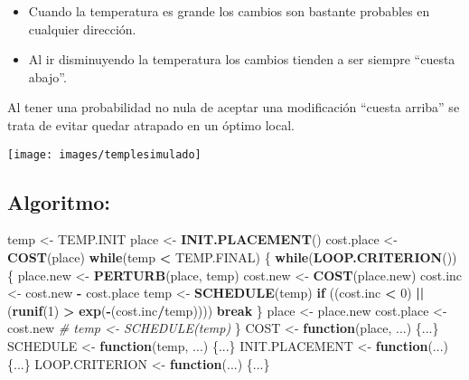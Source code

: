 \documentclass[
]{book}
\newenvironment{Shaded}{\begin{snugshade}}{\end{snugshade}}
\newcommand{\CommentTok}[1]{\textcolor[rgb]{0.56,0.35,0.01}{\textit{#1}}}
\newcommand{\ControlFlowTok}[1]{\textcolor[rgb]{0.13,0.29,0.53}{\textbf{#1}}}
\newcommand{\DecValTok}[1]{\textcolor[rgb]{0.00,0.00,0.81}{#1}}
\newcommand{\KeywordTok}[1]{\textcolor[rgb]{0.13,0.29,0.53}{\textbf{#1}}}
\newcommand{\NormalTok}[1]{#1}
\newcommand{\OperatorTok}[1]{\textcolor[rgb]{0.81,0.36,0.00}{\textbf{#1}}}
\newcommand{\StringTok}[1]{\textcolor[rgb]{0.31,0.60,0.02}{#1}}
\theoremstyle{break}
\theoremstyle{definition}
\theoremstyle{definition}
\theoremstyle{definition}
\theoremstyle{remark}
\begin{document}
\begin{itemize}
\item
  Cuando la temperatura es grande los cambios son bastante
  probables en cualquier dirección.
\item
  Al ir disminuyendo la temperatura los cambios tienden a ser
  siempre ``cuesta abajo''.
\end{itemize}

Al tener una probabilidad no nula de aceptar una modificación
``cuesta arriba'' se trata de evitar quedar atrapado en un
óptimo local.

\begin{center}\texttt{[image: images/templesimulado]} \end{center}

\hypertarget{algoritmo-1}{%
\subsection{Algoritmo:}\label{algoritmo-1}}

\begin{Shaded}
\begin{Highlighting}[]
\NormalTok{temp <-}\StringTok{ }\NormalTok{TEMP.INIT}
\NormalTok{place <-}\StringTok{ }\KeywordTok{INIT.PLACEMENT}\NormalTok{()}
\NormalTok{cost.place <-}\StringTok{ }\KeywordTok{COST}\NormalTok{(place)}
\ControlFlowTok{while}\NormalTok{(temp }\OperatorTok{<}\StringTok{ }\NormalTok{TEMP.FINAL) \{}
  \ControlFlowTok{while}\NormalTok{(}\KeywordTok{LOOP.CRITERION}\NormalTok{()) \{}
\NormalTok{    place.new <-}\StringTok{ }\KeywordTok{PERTURB}\NormalTok{(place, temp)}
\NormalTok{    cost.new <-}\StringTok{ }\KeywordTok{COST}\NormalTok{(place.new)}
\NormalTok{    cost.inc <-}\StringTok{ }\NormalTok{cost.new }\OperatorTok{-}\StringTok{ }\NormalTok{cost.place}
\NormalTok{    temp <-}\StringTok{ }\KeywordTok{SCHEDULE}\NormalTok{(temp)}
    \ControlFlowTok{if}\NormalTok{ ((cost.inc }\OperatorTok{<}\StringTok{ }\DecValTok{0}\NormalTok{) }\OperatorTok{||}\StringTok{ }\NormalTok{(}\KeywordTok{runif}\NormalTok{(}\DecValTok{1}\NormalTok{) }\OperatorTok{>}\StringTok{ }\KeywordTok{exp}\NormalTok{(}\OperatorTok{-}\NormalTok{(cost.inc}\OperatorTok{/}\NormalTok{temp)))) }\ControlFlowTok{break}
\NormalTok{  \}}
\NormalTok{  place <-}\StringTok{ }\NormalTok{place.new}
\NormalTok{  cost.place <-}\StringTok{ }\NormalTok{cost.new}
  \CommentTok{# temp <- SCHEDULE(temp)}
\NormalTok{\}}
\NormalTok{COST <-}\StringTok{ }\ControlFlowTok{function}\NormalTok{(place, ...) \{...\}}
\NormalTok{SCHEDULE <-}\StringTok{ }\ControlFlowTok{function}\NormalTok{(temp, ...) \{...\}}
\NormalTok{INIT.PLACEMENT <-}\StringTok{ }\ControlFlowTok{function}\NormalTok{(...) \{...\}}
\NormalTok{LOOP.CRITERION <-}\StringTok{ }\ControlFlowTok{function}\NormalTok{(...) \{...\}}
\end{Highlighting}
\end{Shaded}
\end{document}
